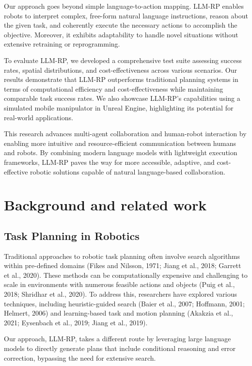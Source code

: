 \documentclass[pdflatex,sn-mathphys-num]{sn-jnl}%
\theoremstyle{thmstyleone}%
\theoremstyle{thmstyletwo}%
\theoremstyle{thmstylethree}%
\begin{document}
Our approach goes beyond simple language-to-action mapping. LLM-RP enables robots to interpret complex, free-form natural language instructions, reason about the given task, and coherently execute the necessary actions to accomplish the objective. Moreover, it exhibits adaptability to handle novel situations without extensive retraining or reprogramming.

To evaluate LLM-RP, we developed a comprehensive test suite assessing success rates, spatial distributions, and cost-effectiveness across various scenarios. Our results demonstrate that LLM-RP outperforms traditional planning systems in terms of computational efficiency and cost-effectiveness while maintaining comparable task success rates. We also showcase LLM-RP's capabilities using a simulated mobile manipulator in Unreal Engine, highlighting its potential for real-world applications.

This research advances multi-agent collaboration and human-robot interaction by enabling more intuitive and resource-efficient communication between humans and robots. By combining modern language models with lightweight execution frameworks, LLM-RP paves the way for more accessible, adaptive, and cost-effective robotic solutions capable of natural language-based collaboration.

\section{Background and related work}

\subsection{Task Planning in Robotics}

Traditional approaches to robotic task planning often involve search algorithms within pre-defined domains (Fikes and Nilsson, 1971; Jiang et al., 2018; Garrett et al., 2020). These methods can be computationally expensive and challenging to scale in environments with numerous feasible actions and objects (Puig et al., 2018; Shridhar et al., 2020). To address this, researchers have explored various techniques, including heuristic-guided search (Baier et al., 2007; Hoffmann, 2001; Helmert, 2006) and learning-based task and motion planning (Akakzia et al., 2021; Eysenbach et al., 2019; Jiang et al., 2019).

Our approach, LLM-RP, takes a different route by leveraging large language models to directly generate plans that include conditional reasoning and error correction, bypassing the need for extensive search.
\end{document}
